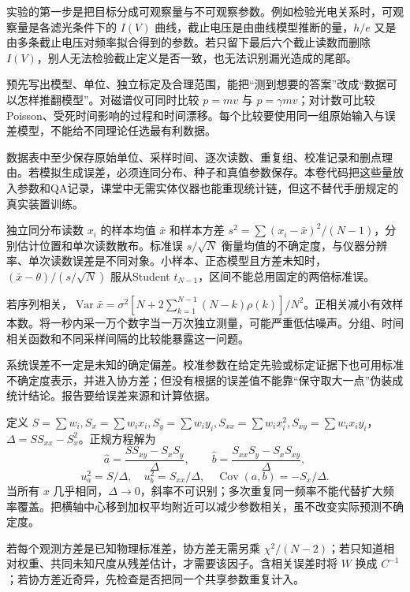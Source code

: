 实验的第一步是把目标分成可观察量与不可观察参数。例如检验光电关系时，可观察量是各滤光条件下的 $I(V)$ 曲线，截止电压是由曲线模型推断的量，$h/e$ 又是由多条截止电压对频率拟合得到的参数。若只留下最后六个截止读数而删除 $I(V)$，别人无法检验截止定义是否一致，也无法识别漏光造成的尾部。

预先写出模型、单位、独立标定及合理范围，能把“测到想要的答案”改成“数据可以怎样推翻模型”。对磁谱仪可同时比较 $p=mv$ 与 $p=\gamma mv$；对计数可比较Poisson、受死时间影响的过程和时间漂移。每个比较要使用同一组原始输入与误差模型，不能给不同理论任选最有利数据。

数据表中至少保存原始单位、采样时间、逐次读数、重复组、校准记录和删点理由。若模拟生成误差，必须连同分布、种子和真值参数保存。本卷代码把这些量放入参数和QA记录，课堂中无需实体仪器也能重现统计链，但这不替代手册规定的真实装置训练。

独立同分布读数 $x_i$ 的样本均值 $\bar x$ 和样本方差 $s^2=\sum(x_i-\bar x)^2/(N-1)$，分别估计位置和单次读数散布。标准误 $s/\sqrt N$ 衡量均值的不确定度，与仪器分辨率、单次读数误差是不同对象。小样本、正态模型且方差未知时，$(\bar x-\theta)/(s/\sqrt N)$ 服从Student $t_{N-1}$，区间不能总用固定的两倍标准误。

若序列相关，$\operatorname{Var}\bar x=\sigma^2[N+2\sum_{k=1}^{N-1}(N-k)\rho(k)]/N^2$。正相关减小有效样本数。将一秒内采一万个数字当一万次独立测量，可能严重低估噪声。分组、时间相关函数和不同采样间隔的比较能暴露这一问题。

系统误差不一定是未知的确定偏差。校准参数在给定先验或标定证据下也可用标准不确定度表示，并进入协方差；但没有根据的误差值不能靠“保守取大一点”伪装成统计结论。报告要给误差来源和计算依据。

定义 $S=\sum w_i,S_x=\sum w_ix_i,S_y=\sum w_iy_i,S_{xx}=\sum w_ix_i^2,S_{xy}=\sum w_ix_iy_i$，$\Delta=SS_{xx}-S_x^2$。正规方程解为
\[
\hat a=\frac{SS_{xy}-S_xS_y}{\Delta},\qquad
\hat b=\frac{S_{xx}S_y-S_xS_{xy}}{\Delta},
\]
\[
u_a^2=S/\Delta,\quad u_b^2=S_{xx}/\Delta,\quad
\operatorname{Cov}(a,b)=-S_x/\Delta.
\]
当所有 $x$ 几乎相同，$\Delta\to0$，斜率不可识别；多次重复同一频率不能代替扩大频率覆盖。把横轴中心移到加权平均附近可以减少参数相关，虽不改变实际预测不确定度。

若每个观测方差是已知物理标准差，协方差无需另乘 $\chi^2/(N-2)$；若只知道相对权重、共同未知尺度从残差估计，才需要该因子。含相关误差时将 $W$ 换成 $C^{-1}$；若协方差近奇异，先检查是否把同一个共享参数重复计入。

